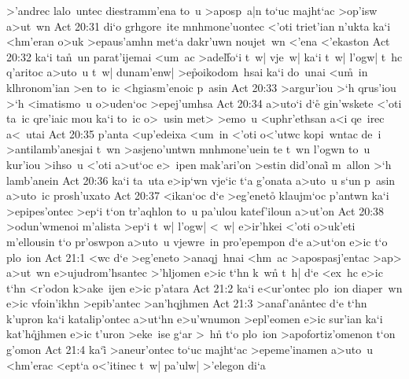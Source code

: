 >'andrec
lalo~untec
diestramm'ena
to~u
>aposp~a|n
to`uc
majht`ac
>op'isw
a>ut~wn\bibvsend
\vs Act 20:31
di`o
grhgore~ite
mnhmone'uontec
<'oti
triet'ian
n'ukta
ka`i
<hm'eran
o>uk
>epaus'amhn
met`a
dakr'uwn
noujet~wn
<'ena
<'ekaston\bibvsend
\vs Act 20:32
ka`i
ta\r{n}~un
parat'ijemai
<um~ac
>adel\r{f}o`i
t~w|
vje~w|
ka`i
t~w|
l'ogw|
t~hc
q'aritoc
a>uto~u
t~w|
dunam'enw|
>e\r{p}oikodom~hsai
ka`i
do~unai
<u\r{m}~in
klhronom'ian
>en
to~ic
<hgiasm'enoic
p~asin\bibvsend
\vs Act 20:33
>argur'iou
>`h
qrus'iou
>`h
<imatismo~u
o>uden`oc
>epej'umhsa\bibvsend
\vs Act 20:34
a>uto`i
d`e\r{}
gin'wskete
<'oti
ta~ic
qre'iaic
mou
ka`i
to~ic
o>~usin
met>
>emo~u
<uphr'ethsan
a<i
qe~irec
a<~utai\bibvsend
\vs Act 20:35
p'anta
<up'edeixa
<um~in
<'oti
o<'utwc
kopi~wntac
de~i
>antilamb'anesjai
t~wn
>asjeno'untwn
mnhmone'uein
te
t~wn
l'ogwn
to~u
kur'iou
>ihso~u
<'oti
a>ut`oc
e>~ipen
mak'ari'on
>estin
did'onai\r{}
m~allon
>`h
lamb'anein\bibvsend
\vs Act 20:36
ka`i
ta~uta
e>ip`wn
vje`ic
t`a
g'onata
a>uto~u
s`un
p~asin
a>uto~ic
prosh'uxato\bibvsend
\vs Act 20:37
<ikan`oc
d`e
>eg'eneto\r{}
klaujm`oc
p'antwn
ka`i
>epipes'ontec
>ep`i
t`on
tr'aqhlon
to~u
pa'ulou
katef'iloun
a>ut'on\bibvsend
\vs Act 20:38
>odun'wmenoi
m'alista
>ep`i
t~w|
l'ogw|
<~w|
e>ir'hkei
<'oti
o>uk'eti
m'ellousin
t`o
pr'oswpon
a>uto~u
vjewre~in
pro'epempon
d`e
a>ut`on
e>ic
t`o
plo~ion\bibvsend
\vs Act 21:1
<wc
d`e
>eg'eneto
>anaqj~hnai
<hm~ac
>apospasj'entac
>ap>
a>ut~wn
e>ujudrom'hsantec
>'hljomen
e>ic
t`hn
k~w\r{n}
t~h|
d`e
<ex~hc
e>ic
t`hn
<r'odon
k>ake~ijen
e>ic
p'atara\bibvsend
\vs Act 21:2
ka`i
e<ur'ontec
plo~ion
diaper~wn
e>ic
vfoin'ikhn
>epib'antec
>an'hqjhmen\bibvsend
\vs Act 21:3
>anaf'an\r{a}ntec
d`e
t`hn
k'upron
ka`i
katalip'ontec
a>ut`hn
e>u'wnumon
>epl'eomen
e>ic
sur'ian
ka`i
kat'h\r{q}jhmen
e>ic
t'uron
>eke~ise
g`ar
>~hn\r{}
t`o
plo~ion
>apofortiz'omenon
t`on
g'omon\bibvsend
\vs Act 21:4
ka`i\r{}
>aneur'ontec
to`uc
majht`ac
>epeme'inamen
a>uto~u
<hm'erac
<ept`a
o<'itinec
t~w|
pa'ulw|
>'elegon
di`a
